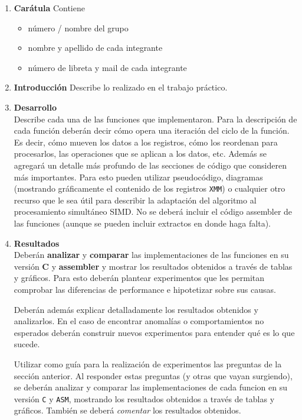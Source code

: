 \documentclass[a4paper, 12pt]{article}
\begin{document}
\begin{enumerate}
    \item
        \textbf{Carátula} Contiene

        \begin{itemize}
            \item número / nombre del grupo
            \item nombre y apellido de cada integrante
            \item número de libreta y mail de cada integrante
        \end{itemize}

    \item
        \textbf{Introducción}
        Describe lo realizado en el trabajo práctico.

    \item
        \textbf{Desarrollo}\\
        Describe cada una de las funciones que implementaron.
	    Para la descripción de cada función deberán decir cómo
        opera una iteración del ciclo de la función.
        Es decir, cómo mueven los datos a los registros, cómo los
        reordenan para procesarlos, las operaciones que se aplican
        a los datos, etc.
        Además se agregará un detalle más profundo de las secciones
        de código que consideren más importantes.
        Para esto pueden utilizar pseudocódigo, diagramas (mostrando
        gráficamente el contenido de los registros \texttt{XMM}) o
        cualquier otro recurso que le sea útil para describir la
        adaptación del algoritmo al procesamiento simultáneo SIMD.
        No se deberá incluir el código assembler de las funciones
        (aunque se pueden incluir extractos en donde haga falta).

	\item
		\textbf{Resultados}\\
		Deberán \textbf{analizar} y \textbf{comparar} las
		implementaciones de las funciones en su versión \textbf{C}
		y \textbf{assembler} y mostrar los resultados obtenidos a
		través de tablas y gráficos.
		Para esto deberán plantear experimentos que les permitan
		comprobar las diferencias de performance e hipotetizar
		sobre sus causas.

		Deberán además explicar detalladamente los resultados
		obtenidos y analizarlos.
		En el caso de encontrar anomalías o comportamientos no
		esperados deberán construir nuevos experimentos para
		entender qué es lo que sucede.


	    Utilizar como guía para la realización de experimentos
	    las preguntas de la sección anterior.
	    Al responder estas preguntas (y otras que vayan surgiendo),
	    se deberán analizar y comparar
        las implementaciones de cada funcion en su versión
        \texttt{C} y \texttt{ASM}, mostrando los resultados obtenidos
        a través de tablas y gráficos.
        También se deberá \emph{comentar} los resultados obtenidos.


\end{enumerate}
\end{document}
